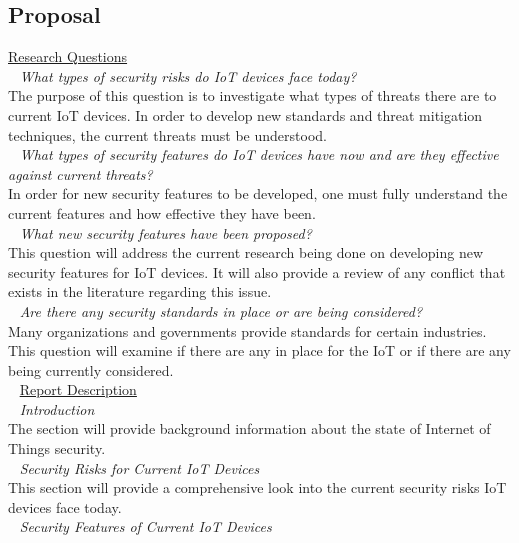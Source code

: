 \documentclass[letterpaper, 12pt]{texMemo}
\begin{document}
\begin{flushleft}
\subsection*{Proposal}
\underline{Research Questions}\\
~\newline
\textit{What types of security risks do IoT devices face today?}\\
The purpose of this question is to investigate what types of threats there are to current IoT devices. In order to develop new standards and threat mitigation techniques,
the current threats must be understood. \\
~\newline
\textit{What types of security features do IoT devices have now and are they effective against current threats?}\\
In order for new security features to be developed, one must fully understand the current features and how effective they have been. \\
~\newline
\textit{What new security features have been proposed?}\\
This question will address the current research being done on developing new security features for IoT devices. It will also provide a review of any conflict that exists
in the literature regarding this issue. \\
~\newline
\textit{Are there any security standards in place or are being considered?}\\
Many organizations and governments provide standards for certain industries. This question will examine if there are any in place for the IoT or if there are any being
currently considered.\\ 
~\newline
\underline{Report Description}\\
~\newline
\textit{Introduction}\\
The section will provide background information about the state of Internet of Things security.\\ 
~\newline
\textit{Security Risks for Current IoT Devices}\\
This section will provide a comprehensive look into the current security risks IoT devices face today. \\
~\newline
\textit{Security Features of Current IoT Devices}\\

\end{flushleft}
\end{document}
